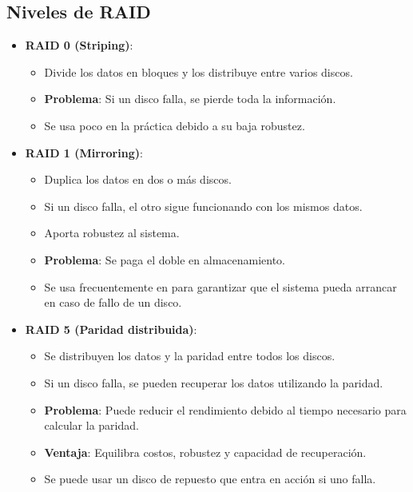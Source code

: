 \subsection{Niveles de RAID}
\begin{itemize}
    \item \textbf{RAID 0 (Striping)}:
    \begin{itemize}
        \item Divide los datos en bloques y los distribuye entre varios discos.
        \item \textbf{Problema}: Si un disco falla, se pierde toda la información.
        \item Se usa poco en la práctica debido a su baja robustez.
    \end{itemize}
    
    \item \textbf{RAID 1 (Mirroring)}:
    \begin{itemize}
        \item Duplica los datos en dos o más discos.
        \item Si un disco falla, el otro sigue funcionando con los mismos datos.
        \item Aporta robustez al sistema.
        \item \textbf{Problema}: Se paga el doble en almacenamiento.
        \item Se usa frecuentemente en  para garantizar que el sistema pueda arrancar en caso de fallo de un disco.
    \end{itemize}
    
    \item \textbf{RAID 5 (Paridad distribuida)}:
    \begin{itemize}
        \item Se distribuyen los datos y la paridad entre todos los discos.
        \item Si un disco falla, se pueden recuperar los datos utilizando la paridad.
        \item \textbf{Problema}: Puede reducir el rendimiento debido al tiempo necesario para calcular la paridad.
        \item \textbf{Ventaja}: Equilibra costos, robustez y capacidad de recuperación.
        \item Se puede usar un disco de repuesto que entra en acción si uno falla.
    \end{itemize}
\end{itemize}

